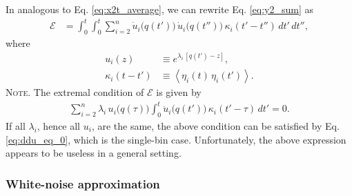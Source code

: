 \documentclass[reprint]{revtex4-1}
\newcommand{\note}[1]{{\color{DarkGreen}\footnotesize \textsc{Note.} #1}}
\begin{document}
In analogous to Eq. \eqref{eq:x2t_average},
we can rewrite Eq. \eqref{eq:y2_sum} as
%
\begin{align}
  \mathcal E
  &=
  \int_0^t \int_0^t
  \sum_{i = 2}^n
  \dot u_i\bigl( q(t') \bigr) \,
  \dot u_i\bigl( q(t'') \bigr) \,
  \kappa_i(t' - t'') \, dt' \, dt'',
  \label{eq:error_mbin}
\end{align}
%
where
\begin{align*}
  u_i(z)
  &\equiv
  e^{\lambda_i \, [q(t') - z]},
  \\
  \kappa_i(t - t')
  &\equiv
  \left\langle
    \eta_i(t) \, \eta_i(t')
  \right\rangle.
\end{align*}
%
\note{The extremal condition of $\mathcal E$ is given by
%
\begin{align}
\sum_{i=2}^n
\lambda_i \, u_i\bigl( q(\tau) \bigr)
\int_0^t
\ddot u_i\bigl( q(t') \bigr) \, \kappa_i(t' - \tau) \, dt' = 0.
\label{eq:optimal_mbin}
\end{align}
%
If all $\lambda_i$, hence all $u_i$, are the same,
the above condition can be satisfied
by Eq. \eqref{eq:ddu_eq_0},
which is the single-bin case.
%
Unfortunately, the above expression
appears to be useless in a general setting.
}



\subsubsection{White-noise approximation}
\end{document}
